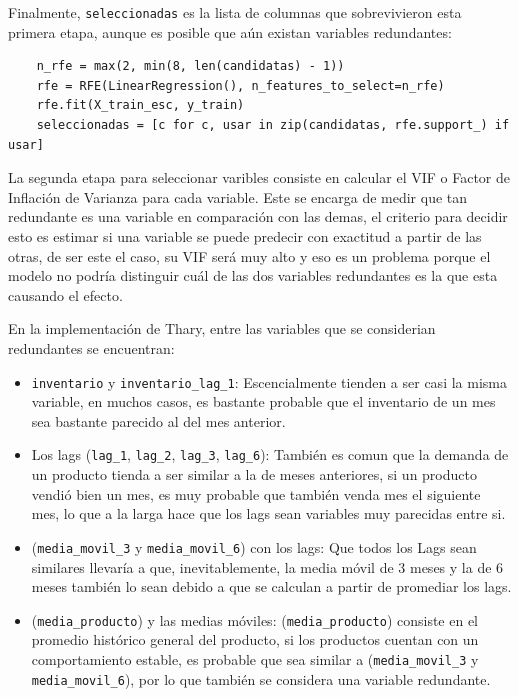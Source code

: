 Finalmente, \texttt{seleccionadas} es la lista de columnas que sobrevivieron esta primera etapa, aunque es posible que aún existan variables redundantes:

\label{lst:regresion_rfe}
\begin{verbatim}
    n_rfe = max(2, min(8, len(candidatas) - 1))
    rfe = RFE(LinearRegression(), n_features_to_select=n_rfe)
    rfe.fit(X_train_esc, y_train)
    seleccionadas = [c for c, usar in zip(candidatas, rfe.support_) if usar]
\end{verbatim}

La segunda etapa para seleccionar varibles consiste en calcular el VIF o Factor de Inflación de Varianza para cada variable. Este se encarga de medir que tan redundante es una variable en comparación con las demas, el criterio para decidir esto es estimar si una variable se puede predecir con exactitud a partir de las otras, de ser este el caso, su VIF será muy alto y eso es un problema porque el modelo no podría distinguir cuál de las dos variables redundantes es la que esta causando el efecto.

En la implementación de Thary, entre las variables que se considerian redundantes se encuentran:

\begin{itemize}
    \item \texttt{inventario} y \texttt{inventario\_lag\_1}: Escencialmente tienden a ser casi la misma variable, en muchos casos, es bastante probable que el inventario de un mes sea bastante parecido al del mes anterior.
    \item Los lags (\texttt{lag\_1}, \texttt{lag\_2}, \texttt{lag\_3}, \texttt{lag\_6}): También es comun que la demanda de un producto tienda a ser similar a la de meses anteriores, si un producto vendió bien un mes, es muy probable que también venda mes el siguiente mes, lo que a la larga hace que los lags sean variables muy parecidas entre si.
    \item (\texttt{media\_movil\_3} y \texttt{media\_movil\_6}) con los lags: Que todos los Lags sean similares llevaría a que, inevitablemente, la media móvil de 3 meses y la de 6 meses también lo sean debido a que se calculan a partir de promediar los lags.
    \item (\texttt{media\_producto}) y las medias móviles: (\texttt{media\_producto}) consiste en el promedio histórico general del producto, si los productos cuentan con un comportamiento estable, es probable que sea similar a (\texttt{media\_movil\_3} y \texttt{media\_movil\_6}), por lo que también se considera una variable redundante.
\end{itemize}

